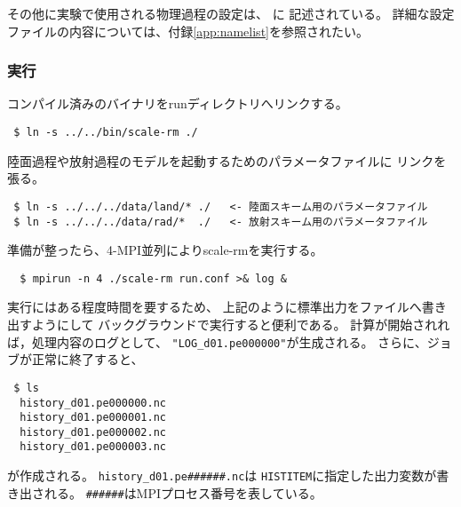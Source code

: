 \noindent その他に実験で使用される物理過程の設定は、
に
記述されている。
詳細な設定ファイルの内容については、付録\ref{app:namelist}を参照されたい。

%
\subsubsection{実行}
コンパイル済みのバイナリをrunディレクトリへリンクする。

\begin{verbatim}
 $ ln -s ../../bin/scale-rm ./
\end{verbatim}
陸面過程や放射過程のモデルを起動するためのパラメータファイルに
リンクを張る。
\begin{verbatim}
 $ ln -s ../../../data/land/* ./   <- 陸面スキーム用のパラメータファイル
 $ ln -s ../../../data/rad/*  ./   <- 放射スキーム用のパラメータファイル
\end{verbatim}
準備が整ったら、4-MPI並列によりscale-rmを実行する。
\begin{verbatim}
  $ mpirun -n 4 ./scale-rm run.conf >& log &
\end{verbatim}


実行にはある程度時間を要するため、
上記のように標準出力をファイルへ書き出すようにして
バックグラウンドで実行すると便利である。
計算が開始されれば，処理内容のログとして、
\verb|"LOG_d01.pe000000"|が生成される。
さらに、ジョブが正常に終了すると、
\begin{verbatim}
 $ ls
  history_d01.pe000000.nc
  history_d01.pe000001.nc
  history_d01.pe000002.nc
  history_d01.pe000003.nc
\end{verbatim}
が作成される。
\verb|history_d01.pe######.nc|は
\verb|HISTITEM|に指定した出力変数が書き出される。
\verb|######|はMPIプロセス番号を表している。



